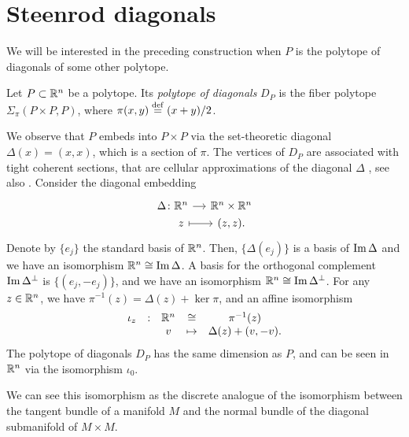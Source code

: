 
\section{Steenrod diagonals}

We will be interested in the preceding construction when $P$ is the polytope of diagonals of some other polytope.

\begin{definition}
	Let $P\subset \mathbb{R}^n$ be a polytope.
	Its \emph{polytope of diagonals} $D_P$ is the fiber polytope $\Sigma_\pi(P\times P, P)$, where $\pi(x,y)\stackrel{\mathrm{def}}{=} (x+y)/2$.
\end{definition}

We observe that $P$ embeds into $P\times P$ via the set-theoretic diagonal $\Delta (x)=(x,x)$, which is a section of $\pi$.
The vertices of $D_P$ are associated with tight coherent sections, that are cellular approximations of the diagonal $\Delta$ \cite[Proposition 5]{MTTV19}, see also \cite[Proposition 1.1]{GLA21}.
Consider the diagonal embedding
\[
\begin{tikzcd}[row sep=0, column sep=small]
	\Delta \colon \R^n \arrow{r} & \R^n \times \R^n \\
	\phantom{\Delta \colon} z \arrow[r, |->] & (z,z).
\end{tikzcd}
\]
Denote by $\{e_j\}$ the standard basis of $\mathbb{R}^n$.
Then, $\{\Delta (e_j)\}$ is a basis of $\operatorname{\mathrm{Im}} \Delta$ and we have an isomorphism $\mathbb{R}^n \cong \operatorname{\mathrm{Im}} \Delta$.
A basis for the orthogonal complement $\operatorname{\mathrm{Im}} \Delta^{\bot}$ is $\{(e_j,-e_j)\}$, and we have an isomorphism $\mathbb{R}^n \cong \operatorname{\mathrm{Im}} \Delta^{\bot}$.
For any $z \in \mathbb{R}^n$, we have $\pi^{-1}(z)=\Delta(z)+\ker \pi$, and an affine isomorphism
\begin{equation} \label{eq:D_P-iso}
	\begin{matrix}
		\iota_z & : & \mathbb{R}^n  & \cong & \pi^{-1}(z) \\
		& & v  & \mapsto & \Delta(z)+(v,-v).
	\end{matrix}
\end{equation}
The polytope of diagonals $D_P$ has the same dimension as $P$, and can be seen in $\mathbb{R}^n$ via the isomorphism $\iota_0$.

\begin{remark}
	We can see this isomorphism as the discrete analogue of the isomorphism between the tangent bundle of a manifold $M$ and the normal bundle of the diagonal submanifold of $M\times M$.
\end{remark}

